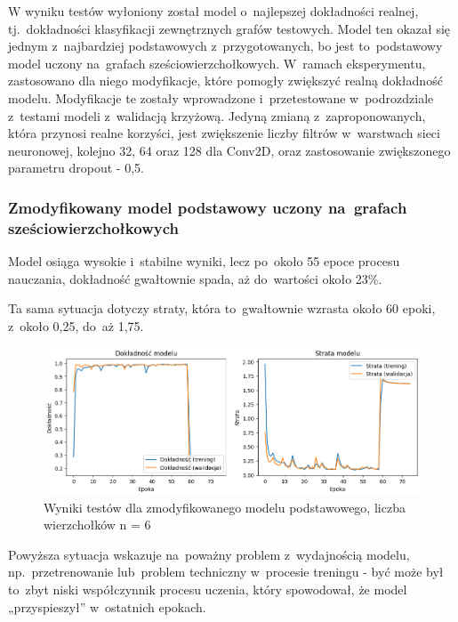 W wyniku testów wyłoniony został model o~najlepszej dokładności realnej,
tj.~dokładności klasyfikacji zewnętrznych grafów testowych.
Model ten okazał się jednym z~najbardziej podstawowych z~przygotowanych,
bo jest to~podstawowy model uczony na~grafach sześciowierzchołkowych.
W~ramach eksperymentu, zastosowano dla niego modyfikacje,
które pomogły zwiększyć realną dokładność modelu.
Modyfikacje te zostały wprowadzone i~przetestowane w~podrozdziale z~testami modeli
z~walidacją krzyżową.
Jedyną zmianą z~zaproponowanych, która przynosi realne korzyści,
jest zwiększenie liczby filtrów w~warstwach sieci neuronowej, kolejno 32, 64 oraz 128 dla Conv2D,
oraz zastosowanie zwiększonego parametru dropout - 0,5.

\subsubsection{Zmodyfikowany model podstawowy uczony na~grafach sześciowierzchołkowych}

Model osiąga wysokie i~stabilne wyniki, lecz po~około 55 epoce procesu nauczania,
dokładność gwałtownie spada, aż do~wartości około 23\%.

Ta sama sytuacja dotyczy straty, która to~gwałtownie wzrasta około 60 epoki,
z~około 0,25, do~aż 1,75.

\begin{figure}[ht]
	\centering
	\includegraphics[width=15.5cm]{resources/tests/images/v4/base6_1_img.png}
	\caption{Wyniki testów dla zmodyfikowanego modelu podstawowego, liczba wierzchołków n = 6}
	\label{Fig:tests-best-0a}
\end{figure}
\FloatBarrier

Powyższa sytuacja wskazuje na~poważny problem z~wydajnością modelu,
np.~przetrenowanie lub~problem techniczny w~procesie treningu
- być może był to~zbyt niski współczynnik procesu uczenia,
który spowodował, że model „przyspieszył” w~ostatnich epokach.


